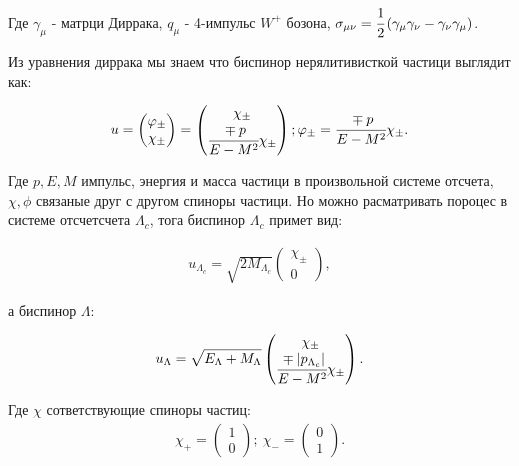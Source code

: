 Где $\gamma_\mu$ - матрци Диррака, $q_\mu$ - 4-импульс $W^+$ бозона,
$\sigma_{\mu\nu} = \cfrac{1}{2} \inner{\gamma_\mu \gamma_\nu - \gamma_\nu \gamma_\mu}$.

Из уравнения диррака мы знаем что биспинор нерялитивисткой частици выглядит как:

\begin{gather}
    u = 
    \begin{pmatrix}
        \phi_\pm \\
        \chi_\pm
    \end{pmatrix}
    =
    \begin{pmatrix}
        \chi_\pm \\
        \cfrac{\mp p}{E - M^2} \chi_\pm
    \end{pmatrix};
    \phi_\pm = \cfrac{\mp p}{E - M^2} \chi_\pm.
\end{gather}

Где $p, E, M$ импульс, энергия и масса частици в произвольной системе отсчета, $\chi, \phi$ связаные друг с другом спиноры частици. 
Но можно расматривать пороцес в системе отсчетсчета $\Lambda_c$, 
тога биспинор $\Lambda_c$ примет вид:

\begin{gather}
    u_{\Lambda_c} = \sqrt{2 M_{\Lambda_c}}
    \begin{pmatrix}
        \chi_\pm \\
        0
    \end{pmatrix},
\end{gather}

а биспинор $\Lambda$: 

\begin{gather}
    u_{\Lambda} = \sqrt{E_{\Lambda} + M_{\Lambda}}
    \begin{pmatrix}
        \chi_\pm \\
        \cfrac{\mp \abs{p_{\Lambda_c}}}{E - M^2} \chi_\pm
    \end{pmatrix}.
\end{gather}

Где $\chi$ сответствующие спиноры частиц:
\begin{gather}
    \chi_+ = 
    \begin{pmatrix}
        1 \\
        0
    \end{pmatrix}; \
    \chi_- = 
    \begin{pmatrix}
        0 \\
        1
    \end{pmatrix}.
\end{gather}

